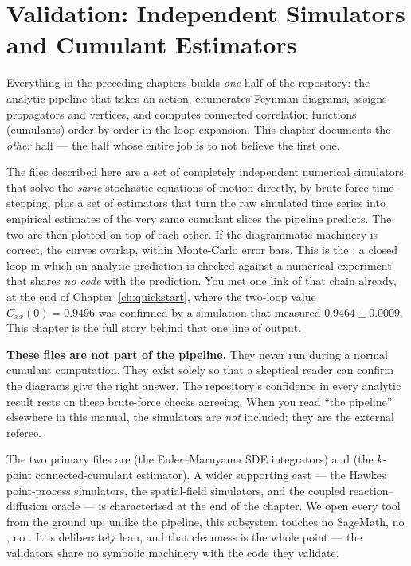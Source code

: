 \chapter{Validation: Independent Simulators and Cumulant Estimators}\label{ch:simulators}

Everything in the preceding chapters builds \emph{one} half of the repository: the
analytic pipeline that takes an \msrjd{} action, enumerates Feynman diagrams,
assigns propagators and vertices, and computes connected correlation functions
(cumulants) order by order in the loop expansion. This chapter documents the
\emph{other} half --- the half whose entire job is to not believe the first one.

The files described here are a set of completely independent numerical
simulators that solve the \emph{same} stochastic equations of motion directly,
by brute-force time-stepping, plus a set of estimators that turn the raw
simulated time series into empirical estimates of the very same cumulant slices
the pipeline predicts. The two are then plotted on top of each other. If the
diagrammatic machinery is correct, the curves overlap, within Monte-Carlo error
bars. This is the : a closed loop in which an analytic
prediction is checked against a numerical experiment that shares \emph{no code}
with the prediction. You met one link of that chain already, at the end of
Chapter~\ref{ch:quickstart}, where the two-loop value $C_{xx}(0) = 0.9496$ was
confirmed by a simulation that measured $0.9464 \pm 0.0009$. This chapter is the
full story behind that one line of output.

\begin{note}
\textbf{These files are not part of the pipeline.} They never run during a normal
cumulant computation. They exist solely so that a skeptical reader can confirm
the diagrams give the right answer. The repository's confidence in every analytic
result rests on these brute-force checks agreeing. When you read ``the pipeline''
elsewhere in this manual, the simulators are \emph{not} included; they are the
external referee.
\end{note}

The two primary files are
 (the Euler--Maruyama SDE integrators)
and  (the $k$-point connected-cumulant
estimator). A wider supporting cast --- the Hawkes point-process simulators, the
spatial-field simulators, and the coupled reaction--diffusion oracle --- is
characterised at the end of the chapter. We open every tool from the ground up:
unlike the pipeline, this subsystem touches no SageMath, no , no
. It is deliberately lean, and that cleanness is the whole point ---
the validators share no symbolic machinery with the code they validate.

